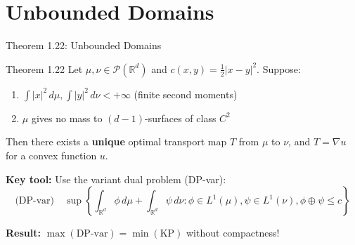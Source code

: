 \documentclass[aspectratio=169]{beamer}
\newcommand{\R}{\mathbb{R}}
\newcommand{\Pp}{\mathcal{P}}
\begin{document}
\section{Unbounded Domains}

\begin{frame}{Theorem 1.22: Unbounded Domains}
\begin{block}{Theorem 1.22}
Let $\mu, \nu \in \Pp(\R^d)$ and $c(x,y) = \frac{1}{2}|x-y|^2$. Suppose:
\begin{enumerate}
    \item $\int |x|^2 \, d\mu, \int |y|^2 \, d\nu < +\infty$ (finite second moments)
    \item $\mu$ gives no mass to $(d-1)$-surfaces of class $C^2$
\end{enumerate}
Then there exists a \textbf{unique} optimal transport map $T$ from $\mu$ to $\nu$, and $T = \nabla u$ for a convex function $u$.
\end{block}

\vspace{0.3cm}
\textbf{Key tool:} Use the variant dual problem (DP-var):
\[
\text{(DP-var)} \quad \sup\left\{\int_{\R^d} \phi \, d\mu + \int_{\R^d} \psi \, d\nu : \phi \in L^1(\mu), \psi \in L^1(\nu), \phi \oplus \psi \leq c\right\}
\]

\vspace{0.2cm}
\textbf{Result:} $\max(\text{DP-var}) = \min(\text{KP})$ without compactness!
\end{frame}
\end{document}
